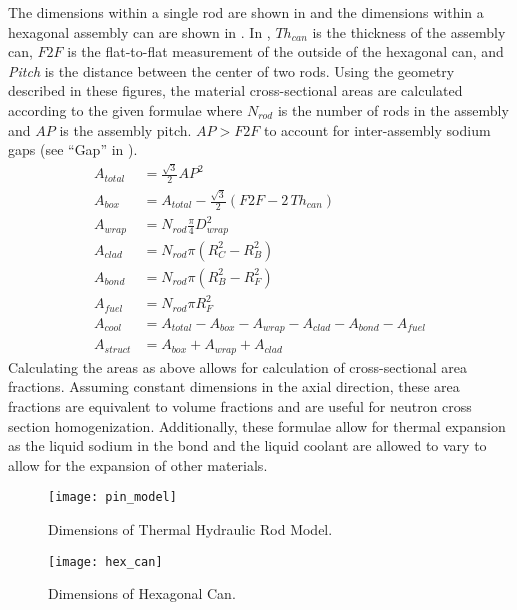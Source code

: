   The dimensions within a single rod are shown in  and the
  dimensions within a hexagonal assembly can are shown in . In
  , $T\!h_{can}$ is the thickness of the assembly can,
  $F\!2\!F$ is the flat-to-flat measurement of the outside of the hexagonal can,
  and \textit{Pitch} is the distance between the center of two rods.  Using the
  geometry described in these figures, the material cross-sectional areas are
  calculated according to the given formulae where $N_{rod}$ is the number of
  rods in the assembly and $A\!P$ is the assembly pitch. $A\!P > F\!2\!F$ to
  account for inter-assembly sodium gaps (see ``Gap'' in ).
  \begin{align}
    \label{eq:afrac_first}
    A_{total} &= \frac{\sqrt{3}}{2} A\!P^2 \\
    A_{box} &= A_{total} - 
      \frac{\sqrt{3}}{2} \left(  F\!2\!F - 2 \, T\!h_{can} \right) \\
    A_{wrap} &= N_{rod} \frac{\pi}{4} D_{wrap}^2 \\
    A_{clad} &= N_{rod} \pi (R_C^2 - R_B^2) \\
    A_{bond} &= N_{rod} \pi (R_B^2 - R_F^2) \\
    A_{fuel} &= N_{rod} \pi R_F^2 \\
    A_{cool} &= A_{total} - A_{box} - A_{wrap} - A_{clad} - A_{bond} -
      A_{fuel}\\
    \label{eq:afrac_last}
    A_{struct} &= A_{box} + A_{wrap} + A_{clad}
  \end{align}
  Calculating the areas as above allows for calculation of cross-sectional area
  fractions. Assuming constant dimensions in the axial direction, these area
  fractions are equivalent to volume fractions and are useful for neutron
  cross section homogenization. Additionally, these formulae allow for thermal
  expansion as the liquid sodium in the bond and the liquid coolant are allowed
  to vary to allow for the expansion of other materials.

  \begin{figure}
    \centering
    \texttt{[image: pin\_model]}
    \caption{Dimensions of Thermal Hydraulic Rod Model.}
    \label{fig:pin_model}
  \end{figure}

  \begin{figure}
    \centering
    \texttt{[image: hex\_can]}
    \caption{Dimensions of Hexagonal Can.}
    \label{fig:hex_can}
  \end{figure}

